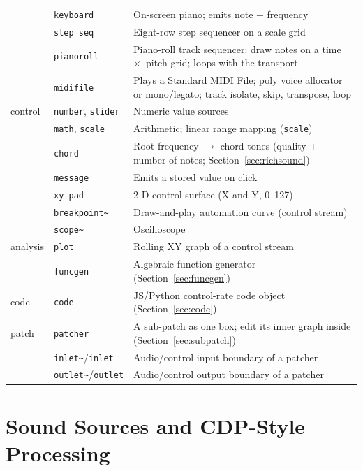 \documentclass[11pt,letterpaper]{article}
\begin{document}
{\begin{longtable}{@{}llp{7.4cm}@{}}
         & \texttt{keyboard}  & On-screen piano; emits note + frequency \\
         & \texttt{step seq}  & Eight-row step sequencer on a scale grid \\
         & \texttt{pianoroll} & Piano-roll track sequencer: draw notes on a time~$\times$~pitch grid; loops with the transport \\
         & \texttt{midifile}  & Plays a Standard MIDI File; poly voice allocator or mono/legato; track isolate, skip, transpose, loop \\
\midrule
control  & \texttt{number}, \texttt{slider} & Numeric value sources \\
         & \texttt{math}, \texttt{scale}    & Arithmetic; linear range mapping (\texttt{scale}) \\
         & \texttt{chord}     & Root frequency $\rightarrow$ chord tones (quality + number of notes; Section~\ref{sec:richsound}) \\
         & \texttt{message}   & Emits a stored value on click \\
         & \texttt{xy pad}    & 2-D control surface (X and Y, 0--127) \\
         & \texttt{breakpoint\~{}} & Draw-and-play automation curve (control stream) \\
         & \texttt{scope\~{}} & Oscilloscope \\
\midrule
analysis & \texttt{plot}      & Rolling XY graph of a control stream \\
         & \texttt{funcgen}   & Algebraic function generator (Section~\ref{sec:funcgen}) \\
\midrule
code     & \texttt{code}      & JS/Python control-rate code object (Section~\ref{sec:code}) \\
\midrule
patch    & \texttt{patcher}   & A sub-patch as one box; edit its inner graph inside (Section~\ref{sec:subpatch}) \\
         & \texttt{inlet\~{}}/\texttt{inlet}   & Audio/control input boundary of a patcher \\
         & \texttt{outlet\~{}}/\texttt{outlet} & Audio/control output boundary of a patcher \\
\bottomrule
\end{longtable}
}

\section{Sound Sources and CDP-Style Processing}
\label{sec:sources}
\end{document}
